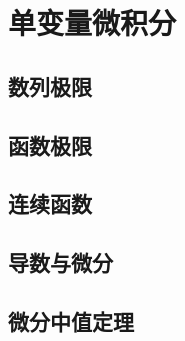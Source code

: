 \part{单变量微积分}

\chapter{数列极限}









\chapter{函数极限}








\chapter{连续函数}







% 
% 

\chapter{导数与微分}\label{chapter:导数}







\chapter{微分中值定理}






